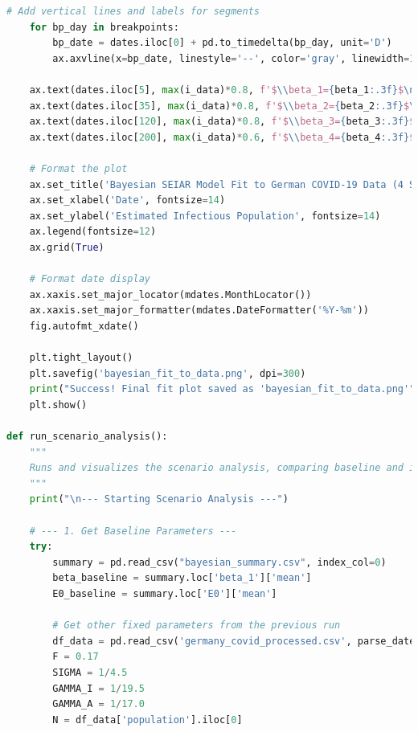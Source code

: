 \documentclass[12pt, a4paper]{article}
\begin{document}
\begin{lstlisting}[language=Python, caption=Python script for plotting the Bayesian model fit and running the scenario analysis.]
    # Add vertical lines and labels for segments
    for bp_day in breakpoints:
        bp_date = dates.iloc[0] + pd.to_timedelta(bp_day, unit='D')
        ax.axvline(x=bp_date, linestyle='--', color='gray', linewidth=1.5)

    ax.text(dates.iloc[5], max(i_data)*0.8, f'$\\beta_1={beta_1:.3f}$\n$\\rho_1={rho_1:.3f}$', fontsize=12, backgroundcolor='white')
    ax.text(dates.iloc[35], max(i_data)*0.8, f'$\\beta_2={beta_2:.3f}$\n$\\rho_2={rho_2:.3f}$', fontsize=12, backgroundcolor='white')
    ax.text(dates.iloc[120], max(i_data)*0.8, f'$\\beta_3={beta_3:.3f}$\n$\\rho_3={rho_3:.3f}$', fontsize=12, backgroundcolor='white')
    ax.text(dates.iloc[200], max(i_data)*0.6, f'$\\beta_4={beta_4:.3f}$\n$\\rho_4={rho_4:.3f}$', fontsize=12, backgroundcolor='white')

    # Format the plot
    ax.set_title('Bayesian SEIAR Model Fit to German COVID-19 Data (4 Segments)', fontsize=18, pad=20)
    ax.set_xlabel('Date', fontsize=14)
    ax.set_ylabel('Estimated Infectious Population', fontsize=14)
    ax.legend(fontsize=12)
    ax.grid(True)
    
    # Format date display
    ax.xaxis.set_major_locator(mdates.MonthLocator())
    ax.xaxis.set_major_formatter(mdates.DateFormatter('%Y-%m'))
    fig.autofmt_xdate()
    
    plt.tight_layout()
    plt.savefig('bayesian_fit_to_data.png', dpi=300)
    print("Success! Final fit plot saved as 'bayesian_fit_to_data.png'")
    plt.show()

def run_scenario_analysis():
    """
    Runs and visualizes the scenario analysis, comparing baseline and intervention effects.
    """
    print("\n--- Starting Scenario Analysis ---")

    # --- 1. Get Baseline Parameters ---
    try:
        summary = pd.read_csv("bayesian_summary.csv", index_col=0)
        beta_baseline = summary.loc['beta_1']['mean']
        E0_baseline = summary.loc['E0']['mean']
        
        # Get other fixed parameters from the previous run
        df_data = pd.read_csv('germany_covid_processed.csv', parse_dates=['date'])
        F = 0.17
        SIGMA = 1/4.5
        GAMMA_I = 1/19.5
        GAMMA_A = 1/17.0
        N = df_data['population'].iloc[0]
        

\end{lstlisting}
\end{document}
